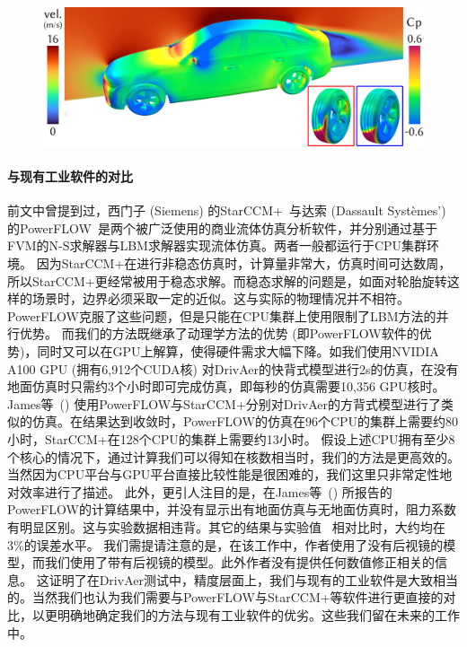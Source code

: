 \begin{figure}[htb]
  \centering
    \includegraphics[width=0.99\columnwidth]{figures/tum_fastback.png}
  \label{img:fastback}
\end{figure}

\paragraph{与现有工业软件的对比}
前文中曾提到过，西门子 (Siemens) 的StarCCM+~\cite{Siemens}与达索 (Dassault Syst{\`e}mes') 的PowerFLOW~\cite{powerflow}是两个被广泛使用的商业流体仿真分析软件，并分别通过基于FVM的N-S求解器与LBM求解器实现流体仿真。两者一般都运行于CPU集群环境。
因为StarCCM+在进行非稳态仿真时，计算量非常大，仿真时间可达数周，所以StarCCM+更经常被用于稳态求解。而稳态求解的问题是，如面对轮胎旋转这样的场景时，边界必须采取一定的近似。这与实际的物理情况并不相符。PowerFLOW克服了这些问题，但是只能在CPU集群上使用限制了LBM方法的并行优势。
而我们的方法既继承了动理学方法的优势 (即PowerFLOW软件的优势)，同时又可以在GPU上解算，使得硬件需求大幅下降。如我们使用NVIDIA A100 GPU (拥有6,912个CUDA核) 对DrivAer的快背式模型进行2s的仿真，在没有地面仿真时只需约3个小时即可完成仿真，即每秒的仿真需要10,356 GPU核时。
James等~(\citeyear{James-2018}) 使用PowerFLOW与StarCCM+分别对DrivAer的方背式模型进行了类似的仿真。在结果达到收敛时，PowerFLOW的仿真在96个CPU的集群上需要约80小时，StarCCM+在128个CPU的集群上需要约13小时。
假设上述CPU拥有至少8个核心的情况下，通过计算我们可以得知在核数相当时，我们的方法是更高效的。当然因为CPU平台与GPU平台直接比较性能是很困难的，我们这里只非常定性地对效率进行了描述。
此外，更引人注目的是，在James等~(\citeyear{James-2018}) 所报告的PowerFLOW的计算结果中，并没有显示出有地面仿真与无地面仿真时，阻力系数有明显区别。这与实验数据相违背。其它的结果与实验值~\cite{Heft-2012b} 相对比时，大约均在3\%的误差水平。
我们需提请注意的是，在该工作中，作者使用了没有后视镜的模型，而我们使用了带有后视镜的模型。此外作者没有提供任何数值修正相关的信息。
这证明了在DrivAer测试中，精度层面上，我们与现有的工业软件是大致相当的。当然我们也认为我们需要与PowerFLOW与StarCCM+等软件进行更直接的对比，以更明确地确定我们的方法与现有工业软件的优劣。这些我们留在未来的工作中。

